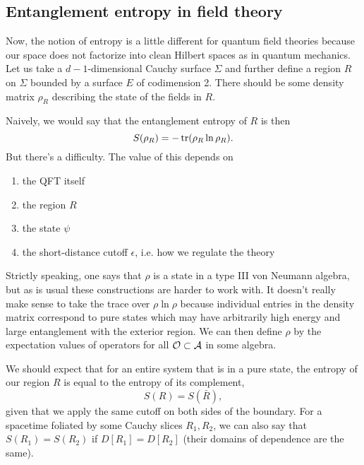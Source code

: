 \subsection*{Entanglement entropy in field theory}
Now, the notion of entropy is a little different for quantum field theories because our space does not factorize into clean Hilbert spaces as in quantum mechanics. Let us take a $d-1$-dimensional Cauchy surface $\Sigma$ and further define a region $R$ on $\Sigma$ bounded by a surface $E$ of codimension 2. There should be some density matrix $\rho_R$ describing the state of the fields in $R$.

Naively, we would say that the entanglement entropy of $R$ is then
\begin{equation}
    S(\rho_R)=-\operatorname{tr}(\rho_R \ln \rho_R).
\end{equation}
But there's a difficulty. The value of this depends on
\begin{enumerate}
    \item the QFT itself
    \item the region $R$
    \item the state $\psi$
    \item the short-distance cutoff $\epsilon$, i.e. how we regulate the theory
\end{enumerate}
Strictly speaking, one says that $\rho$ is a state in a type III von Neumann algebra, but as is usual these constructions are harder to work with. It doesn't really make sense to take the trace over $\rho\ln\rho$ because individual entries in the density matrix correspond to pure states which may have arbitrarily high energy and large entanglement with the exterior region. We can then define $\rho$ by the expectation values of operators for all $\mathcal O\subset \mathcal{A}$ in some algebra.

We should expect that for an entire system that is in a pure state, the entropy of our region $R$ is equal to the entropy of its complement,
\begin{equation}
    S(R) = S(\bar R),
\end{equation}
given that we apply the same cutoff on both sides of the boundary. For a spacetime foliated by some Cauchy slices $R_1,R_2$, we can also say that $S(R_1)=S(R_2)$ if $D[R_1]=D[R_2]$ (their domains of dependence are the same).

